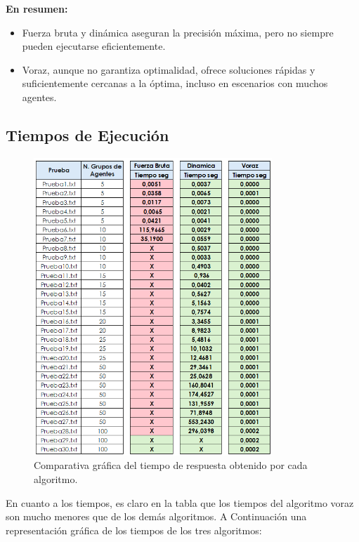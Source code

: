 \documentclass[11pt,letter]{article}
\begin{document}
    \textbf{En resumen:}
    \begin{itemize}
        \item Fuerza bruta y dinámica aseguran la precisión máxima, pero no siempre pueden ejecutarse eficientemente.
        \item Voraz, aunque no garantiza optimalidad, ofrece soluciones rápidas y suficientemente cercanas a la óptima, incluso en escenarios con muchos agentes.
    \end{itemize}

    \subsection{Tiempos de Ejecución}

    \begin{figure}[H]
        \centering
        \includegraphics[width=0.8\textwidth]{resources/tiempos.png}
        \caption{Comparativa gráfica del tiempo de respuesta obtenido por cada algoritmo.}
    \end{figure}

    En cuanto a los tiempos, es claro en la tabla que los tiempos del algoritmo voraz son mucho menores que de los demás algoritmos. A Continuación una representación gráfica de los tiempos de los tres algoritmos:
\end{document}
